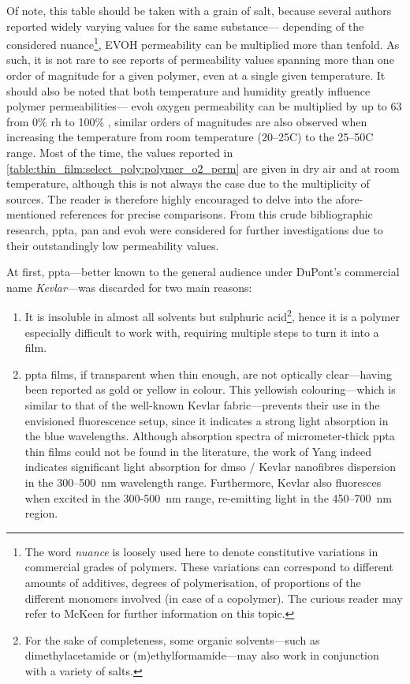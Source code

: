 Of note, this table should be taken with a grain of salt, because several authors reported widely varying values for the same substance---\eg{} depending of the considered nuance\footnote{The word \emph{nuance} is loosely used here to denote constitutive variations in commercial grades of polymers. These variations can correspond to different amounts of additives, degrees of polymerisation, of proportions of the different monomers involved (in case of a copolymer). The curious reader may refer to McKeen for further information on this topic\cite[Chap.~2]{mckeen2017}.}, EVOH permeability can be multiplied more than tenfold\cite[p.~185]{mckeen2017}. As such, it is not rare to see reports of permeability values spanning more than one order of magnitude for a given polymer, even at a single given temperature\cite[App. II]{massey2003}. It should also be noted that both temperature and humidity greatly influence polymer permeabilities---\eg{} \gls{evoh} oxygen permeability can be multiplied by up to 63 from 0\% \gls{rh} to 100\% \cite[pp. 264--5]{massey2003}, similar orders of magnitudes are also observed when increasing the temperature from room temperature (20--25{\degree}C) to the 25--50{\degree}C range\cite[App. II]{massey2003}. Most of the time, the values reported in \ref{table:thin_film:select_poly:polymer_o2_perm} are given in dry air and at room temperature, although this is not always the case due to the multiplicity of sources. The reader is therefore highly encouraged to delve into the afore-mentioned references for precise comparisons. From this crude bibliographic research, \gls{ppta}, \gls{pan} and \gls{evoh} were considered for further investigations due to their outstandingly low permeability values.

At first, \gls{ppta}---better known to the general audience under DuPont's commercial name \emph{Kevlar}---was discarded for two main reasons:
\begin{enumerate}
	\item It is insoluble in almost all solvents but sulphuric acid\cite{sokolova1974, arpin1977}\footnote{For the sake of completeness, some organic solvents---such as dimethylacetamide or (m)ethylformamide---may also work in conjunction with a variety of salts\cite{westerhof2009phd}.}, hence it is a polymer especially difficult to work with, requiring multiple steps to turn it into a film\cite{flood1982, fujita1989}.
	\item \Gls{ppta} films, if transparent when thin enough, are not optically clear---having been reported as gold or yellow in colour\cite{fujita1989, weinkauf1992, lu2018}. This yellowish colouring---which is similar to that of the well-known Kevlar fabric---prevents their use in the envisioned fluorescence setup, since it indicates a strong light absorption in the blue wavelengths. Although absorption spectra of micrometer-thick \gls{ppta} thin films could not be found in the literature, the work of Yang \etal{} indeed indicates significant light absorption for \gls{dmso} / Kevlar nanofibres dispersion in the 300--500~nm wavelength range\cite{yang2015}. Furthermore, Kevlar also fluoresces when excited in the 300-500~nm range, re-emitting light in the 450--700~nm region\cite{penn1979}.
\end{enumerate}

